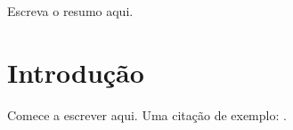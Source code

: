 \documentclass[article,12pt,oneside,a4paper]{abntex2}
\begin{document}
\maketitle

\begin{resumo}
Escreva o resumo aqui.
\end{resumo}

\textual
\section{Introdução}
Comece a escrever aqui.
Uma citação de exemplo: \cite{lamport1994}.

\postextual


\end{document}

